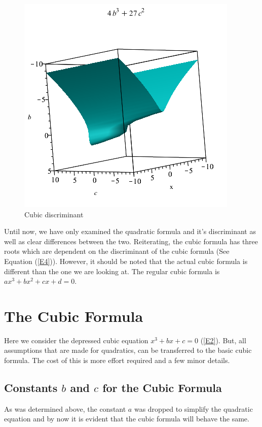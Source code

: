 \documentclass[14pt]{extarticle}
\begin{document}
\begin{figure}
	\begin{center}
		\includegraphics[scale=0.50]{graph6.png}
		\caption{\small Cubic discriminant}
		\label{fig:img7}
	\end{center}
\end{figure}
Until now, we have only examined the quadratic formula and it's discriminant as well as clear differences between the two. Reiterating, the cubic formula has three roots which are dependent on the discriminant of the cubic formula (See Equation (\ref{E4})). However, it should be noted that the actual cubic formula is different than the one we are looking at. The regular cubic formula is $ax^3+bx^2+cx+d=0$.

\section{The Cubic Formula}
Here we consider the depressed cubic equation $x^3+bx+c=0$ (\ref{E2}). But, all assumptions that are made for quadratics, can be transferred to the basic cubic formula. The cost of this is more effort required and a few minor details.

\subsection{Constants $b$ and $c$ for the Cubic Formula}


As was determined above, the constant $a$ was dropped to simplify the quadratic equation and by now it is evident that the cubic formula will behave the same.
\end{document}
